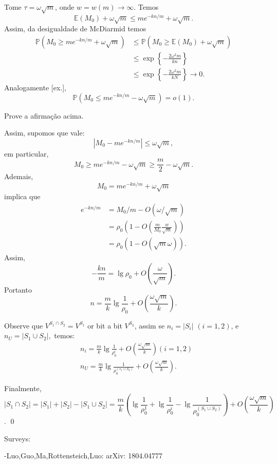 Tome $\tau = \omega\sqrt{m}$, onde $w = w(m) \to \infty$. Temos
\[\mathbb{E}(M_0) + \omega\sqrt{m} \le me^{-kn/m} + \omega\sqrt m.\]
Assim, da desigualdade de McDiarmid temos
\begin{align*}
\mathbb{P}(M_0 \ge me^{-kn/m} + \omega\sqrt m)&\le \mathbb{P}(M_0 \ge \mathbb{E}(M_0) + \omega\sqrt{m})\\
											   &\le \exp \left\{-\frac{2\omega^2m}{kn}\right\}\\
											   &\le \exp
                                               \left\{-\frac{2\omega^2m}{kN}\right\}
                                               \to 0.
\end{align*}
Analogamente [ex.],
\[\mathbb{P}(M_0 \le me^{-kn/m} - \omega\sqrt m)= o(1).\]
\begin{exercicio}
    Prove a afirmação acima.
\end{exercicio}
Assim, supomos que vale:
\[|M_0 - me^{-kn/m}|\le \omega\sqrt{m},\]
em particular,
\[M_0 \ge me^{-kn/m} - \omega\sqrt m \ge \frac{m}{2}-\omega\sqrt m.\]
Ademais,
\[M_0 = me^{-kn/m} + \omega\sqrt m\]
implica que 
\begin{align*}
e^{-kn/m} &= M_0/m - O(\omega/\sqrt m)\\
		  &=\rho_0\left( 1 - O\left(\frac{m}{M_0}\frac{w}{\sqrt m}\right)\right)\\
		  &=\rho_0\left( 1 - O(\sqrt m \omega)\right). 
\end{align*}
Assim,
\[-\frac{kn}{m} = \lg \rho_0 + O\left(\frac{\omega}{\sqrt m}\right).\]
Portanto
\[n = \frac{m}{k} \lg \frac{1}{\rho_0} + O\left(\frac{\omega \sqrt m }{k}\right).\]

Observe que $V^{S_1\cap S_2} = V^{S_1} $ or bit a bit $V^{S_2}$, assim se $n_i=|S_i|$  $(i=1,2)$, e $n_U = |S_1\cup S_2|,$ temos:
\begin{align*}
&n_i = \frac{m}{k} \lg \frac{1}{\rho_0^i} + O\left(\frac{\omega \sqrt m}{k}\right) 	(i=1,2)\\
&n_U = \frac{m}{k} \lg \frac{1}{\rho_0^{(s_1 \cup S_2)}} +
O\left(\frac{\omega \sqrt m}{k}\right).
\end{align*}

Finalmente,
\[|S_1 \cap S_2| = |S_1| + |S_2| - |S_1\cup S_2| = \frac{m}{k}\left( \lg
\frac{1}{\rho_0^1} + \lg \frac{1}{\rho_0^i} - \lg
\frac{1}{\rho_0^{(S_1\cup S_2)}} \right)+ O\left(\frac{\omega \sqrt
m}{k}\right) \].
\qed

Surveys:

-Luo,Guo,Ma,Rottensteich,Luo: arXiv: 1804.04777

